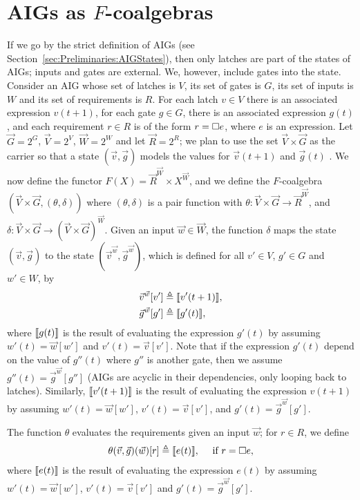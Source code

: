 \section{AIGs as $F$-coalgebras}
\label{sec:Classification:LatentBehaviours}
If we go by the strict definition of AIGs (see Section~\ref{sec:Preliminaries:AIGStates}), then only latches are part of the states of AIGs; inputs and gates are external. We, however, include gates into the state. Consider an AIG whose set of latches is $V$, its set of gates is $G$, its set of inputs is $W$ and its set of requirements is ${R}$. For each latch $v\in V$ there is an associated expression $v(t+1)$, for each gate $g\in G$, there is an associated expression $g(t)$, and each requirement $r\in {R}$ is of the form $r={{\square}} e$, where $e$ is an expression. 
Let $\vec{G}=2^G$, $\vec{V}=2^{V}$, $\vec{W}=2^W$ and let $\vec{{R}}=2^{{R}}$; we plan to use the set $\vec{V}\times \vec{G}$ as the carrier so that a state $(\vec{v},\vec{g})$ models the values for $\vec{v}(t+1)$ and $\vec{g}(t)$%
. We now define the functor $F(X)=\vec{{R}}^{\vec{W}}\times X^{\vec{W}}$, and we define the $F$-coalgebra $(\vec{V}\times\vec{G},(\theta,\delta))$ where $(\theta,\delta)$ is a pair function with $\theta\colon \vec{V}\times \vec{G}\rightarrow \vec{{R}}^{\vec{W}}$, and $\delta\colon\vec{V}\times \vec{G} \rightarrow (\vec{V}\times \vec{G})^{\vec{W}}$. Given an input $\vec{w}\in \vec{W}$, the function $\delta$ maps the state $(\vec{v},\vec{g})$ to the state $(\vec{v}^{\vec{w}}, \vec{g}^{\vec{w}})$, which is defined for all $v'\in V$, $g'\in G$ and $w'\in W$, by 
\begin{align}
	\vec{v}^{\vec{w}}[v']&\triangleq {{\llbracket v'(t+1)\rrbracket}},\\
	\vec{g}^{\vec{w}}[g']&\triangleq {{\llbracket g'(t)\rrbracket}},
\end{align}
where ${{\llbracket g(t)\rrbracket}}$ is the result of evaluating the expression $g'(t)$ by assuming $w'(t)=\vec{w}[w']$ and $v'(t)=\vec{v}[v']$. Note that if the expression $g'(t)$ depend on the value of $g''(t)$ where $g''$ is another gate, then we assume $g''(t)=\vec{g}^{\vec{w}}[g'']$ (AIGs are acyclic in their dependencies, only looping back to latches). Similarly, ${{\llbracket v'(t+1)\rrbracket}}$ is the result of evaluating the expression $v(t+1)$ by assuming $w'(t)=\vec{w}[w']$, $v'(t)=\vec{v}[v']$, and $g'(t)=\vec{g}^{\vec{w}}[g']$. %

The function $\theta$ evaluates the requirements given an input $\vec{w}$; for $r \in {R}$, we define
\begin{align}
	\theta(\vec{v},\vec{g})(\vec{w})[r]\triangleq {{\llbracket e(t)\rrbracket}}, \quad \text{ if $r={{\square}}{e}$}, 
\end{align}
where ${{\llbracket e(t)\rrbracket}}$ is the result of evaluating the expression $e(t)$ by assuming $w'(t)=\vec{w}[w']$, $v'(t)=\vec{v}[v']$ and $g'(t)=\vec{g}^{\vec{w}}[g']$.

